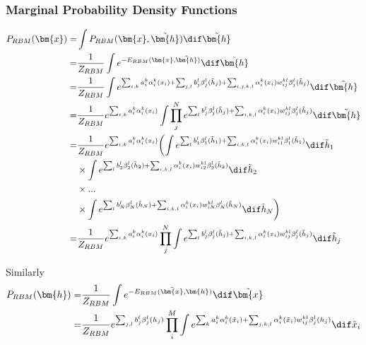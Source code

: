 \subsubsection{Marginal Probability Density Functions}
\begin{align}
	P_{RBM} (\bm{x}) =& \int P_{RBM} (\bm{x}, \tilde{\bm{h}}) \dif \tilde{\bm{h}} \nonumber \\
	=& \frac{1}{Z_{RBM}} \int e^{-E_{RBM} (\bm{x}, \tilde{\bm{h}}) } \dif \tilde{\bm{h}} \nonumber \\
	=& \frac{1}{Z_{RBM}} \int e^{\sum_{i, k} a_i^k \alpha_i^k (x_i)
	+ \sum_{j, l} b_j^l \beta_j^l (\tilde{h}_j) 
	+ \sum_{i,j,k,l} \alpha_i^k (x_i) w_{ij}^{kl} \beta_j^l (\tilde{h}_j)} 
	\dif \tilde{\bm{h}} \nonumber \\
	=& \frac{1}{Z_{RBM}} e^{\sum_{i, k} a_i^k \alpha_i^k (x_i)}
	\int \prod_j^N e^{\sum_l b_j^l \beta_j^l (\tilde{h}_j) 
	+ \sum_{i,k,l} \alpha_i^k (x_i) w_{ij}^{kl} \beta_j^l (\tilde{h}_j)} \dif \tilde{\bm{h}} \nonumber \\
	=& \frac{1}{Z_{RBM}} e^{\sum_{i, k} a_i^k \alpha_i^k (x_i)}
	\biggl( \int e^{\sum_l b_1^l \beta_1^l (\tilde{h}_1) + \sum_{i,k,l} \alpha_i^k (x_i) w_{i1}^{kl} \beta_1^l (\tilde{h}_1)} \dif  \tilde{h}_1 \nonumber \\
	& \times \int e^{\sum_l b_2^l \beta_2^l (\tilde{h}_2) + \sum_{i,k,l} \alpha_i^k (x_i) w_{i2}^{kl} \beta_2^l (\tilde{h}_2)} \dif  \tilde{h}_2 \nonumber \\
	& \times ... \nonumber \\
	& \times \int e^{\sum_l b_N^l \beta_N^l (\tilde{h}_N) + \sum_{i,k,l} \alpha_i^k (x_i) w_{iN}^{kl} \beta_N^l (\tilde{h}_N)} \dif  \tilde{h}_N \biggr) \nonumber \\
	=& \frac{1}{Z_{RBM}} e^{\sum_{i, k} a_i^k \alpha_i^k (x_i)}
	\prod_j^N \int e^{\sum_l b_j^l \beta_j^l (\tilde{h}_j) + \sum_{i,k,l} \alpha_i^k (x_i) w_{ij}^{kl} \beta_j^l (\tilde{h}_j)}  \dif \tilde{h}_j
\end{align}

Similarly
\begin{align}
	P_{RBM} (\bm{h}) =& \frac{1}{Z_{RBM}} \int e^{-E_{RBM} (\tilde{\bm{x}}, \bm{h})} \dif \tilde{\bm{x}} \nonumber \\
	=& \frac{1}{Z_{RBM}} e^{\sum_{j, l} b_j^l \beta_j^l (h_j)}
	\prod_i^M \int e^{\sum_k a_i^k \alpha_i^k (\tilde{x}_i)
	+ \sum_{j,k,l} \alpha_i^k (\tilde{x}_i) w_{ij}^{kl} \beta_j^l (h_j)} \dif \tilde{x}_i
\end{align}

